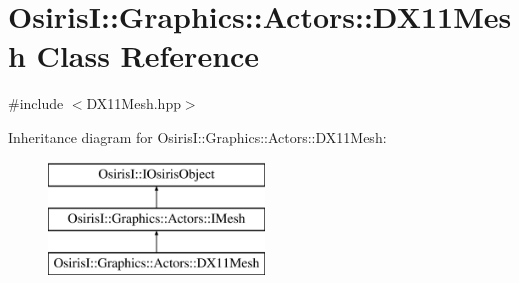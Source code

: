 \hypertarget{class_osiris_i_1_1_graphics_1_1_actors_1_1_d_x11_mesh}{\section{Osiris\-I\-:\-:Graphics\-:\-:Actors\-:\-:D\-X11\-Mesh Class Reference}
\label{class_osiris_i_1_1_graphics_1_1_actors_1_1_d_x11_mesh}
}


{\ttfamily \#include $<$D\-X11\-Mesh.\-hpp$>$}

Inheritance diagram for Osiris\-I\-:\-:Graphics\-:\-:Actors\-:\-:D\-X11\-Mesh\-:\begin{figure}[H]
\begin{center}
\leavevmode
\includegraphics[height=3.000000cm]{class_osiris_i_1_1_graphics_1_1_actors_1_1_d_x11_mesh}
\end{center}
\end{figure}
